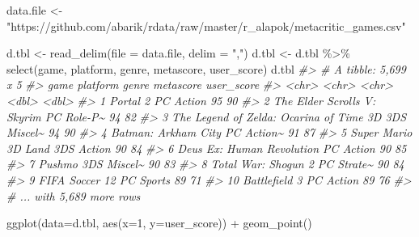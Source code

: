 \documentclass[
]{book}
\newenvironment{Shaded}{\begin{snugshade}}{\end{snugshade}}
\newcommand{\AttributeTok}[1]{\textcolor[rgb]{0.77,0.63,0.00}{#1}}
\newcommand{\CommentTok}[1]{\textcolor[rgb]{0.56,0.35,0.01}{\textit{#1}}}
\newcommand{\DecValTok}[1]{\textcolor[rgb]{0.00,0.00,0.81}{#1}}
\newcommand{\FunctionTok}[1]{\textcolor[rgb]{0.00,0.00,0.00}{#1}}
\newcommand{\NormalTok}[1]{#1}
\newcommand{\OtherTok}[1]{\textcolor[rgb]{0.56,0.35,0.01}{#1}}
\newcommand{\SpecialCharTok}[1]{\textcolor[rgb]{0.00,0.00,0.00}{#1}}
\newcommand{\StringTok}[1]{\textcolor[rgb]{0.31,0.60,0.02}{#1}}
\begin{document}
\begin{Shaded}
\begin{Highlighting}[]
\NormalTok{data.file }\OtherTok{\textless{}{-}} \StringTok{"https://github.com/abarik/rdata/raw/master/r\_alapok/metacritic\_games.csv"}

\NormalTok{d.tbl }\OtherTok{\textless{}{-}} \FunctionTok{read\_delim}\NormalTok{(}\AttributeTok{file =}\NormalTok{ data.file, }\AttributeTok{delim =} \StringTok{","}\NormalTok{)}
\NormalTok{d.tbl }\OtherTok{\textless{}{-}}\NormalTok{ d.tbl }\SpecialCharTok{\%\textgreater{}\%} \FunctionTok{select}\NormalTok{(game, platform, genre, metascore, user\_score)}
\NormalTok{d.tbl}
\CommentTok{\#\textgreater{} \# A tibble: 5,699 x 5}
\CommentTok{\#\textgreater{}    game                                    platform genre   metascore user\_score}
\CommentTok{\#\textgreater{}    \textless{}chr\textgreater{}                                   \textless{}chr\textgreater{}    \textless{}chr\textgreater{}       \textless{}dbl\textgreater{}      \textless{}dbl\textgreater{}}
\CommentTok{\#\textgreater{}  1 Portal 2                                PC       Action         95         90}
\CommentTok{\#\textgreater{}  2 The Elder Scrolls V: Skyrim             PC       Role{-}P\textasciitilde{}        94         82}
\CommentTok{\#\textgreater{}  3 The Legend of Zelda: Ocarina of Time 3D 3DS      Miscel\textasciitilde{}        94         90}
\CommentTok{\#\textgreater{}  4 Batman: Arkham City                     PC       Action\textasciitilde{}        91         87}
\CommentTok{\#\textgreater{}  5 Super Mario 3D Land                     3DS      Action         90         84}
\CommentTok{\#\textgreater{}  6 Deus Ex: Human Revolution               PC       Action         90         85}
\CommentTok{\#\textgreater{}  7 Pushmo                                  3DS      Miscel\textasciitilde{}        90         83}
\CommentTok{\#\textgreater{}  8 Total War: Shogun 2                     PC       Strate\textasciitilde{}        90         84}
\CommentTok{\#\textgreater{}  9 FIFA Soccer 12                          PC       Sports         89         71}
\CommentTok{\#\textgreater{} 10 Battlefield 3                           PC       Action         89         76}
\CommentTok{\#\textgreater{} \# ... with 5,689 more rows}


\FunctionTok{ggplot}\NormalTok{(}\AttributeTok{data=}\NormalTok{d.tbl, }\FunctionTok{aes}\NormalTok{(}\AttributeTok{x=}\DecValTok{1}\NormalTok{, }\AttributeTok{y=}\NormalTok{user\_score)) }\SpecialCharTok{+} \FunctionTok{geom\_point}\NormalTok{()}
\end{Highlighting}
\end{Shaded}
\end{document}

